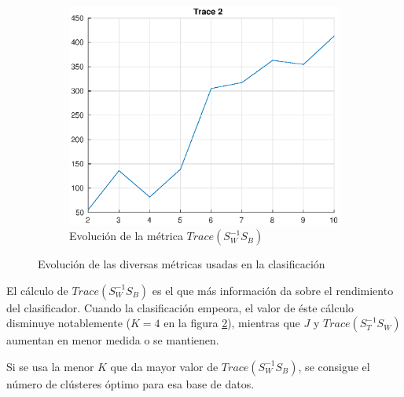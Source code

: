 \documentclass[11pt]{article} %
\begin{document}
\begin{figure}
\begin{subfigure}[b]{0.3\textwidth}
        \label{fig:21:trace:1}
    \end{subfigure}
    \quad
    \begin{subfigure}[b]{0.3\textwidth}
        \includegraphics[width=\textwidth]{../src/fig/21_trace2.eps}
        \caption[]{Evolución de la métrica $Trace \left( S_W^{-1} S_B \right)$}
        \label{fig:21:trace:2}
    \end{subfigure}
    \caption{Evolución de las diversas métricas usadas en la clasificación}
    \label{fig:21:metrics}
\end{figure}

%
%
%
%

El cálculo de $Trace \left( S_W^{-1} S_B \right)$ es el que más información da
sobre el rendimiento del clasificador. Cuando la clasificación empeora, el valor
de éste cálculo disminuye notablemente ($K=4$ en la figura \ref{fig:21:trace:2}),
mientras que $J$ y $Trace \left( S_T^{-1} S_W \right)$ aumentan en menor medida
o se mantienen.

Si se usa la menor $K$ que da mayor valor de $Trace \left( S_W^{-1} S_B \right)$,
se consigue el número de clústeres óptimo para esa base de datos.
\end{document}
